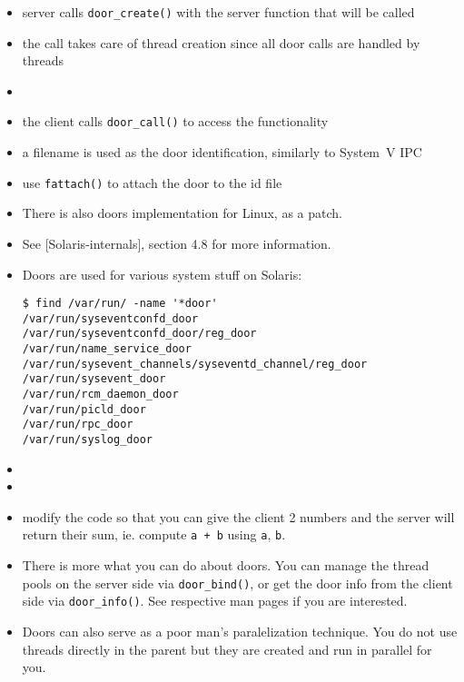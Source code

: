 \begin{itemize}
\item server calls \texttt{door\_create()} with the server function that will be
called
\item the call takes care of thread creation since all door calls are handled by
threads
\item {}
\item the client calls \texttt{door\_call()} to access the functionality
\item a filename is used as the door identification, similarly to System~V IPC
\item use \texttt{fattach()} to attach the door to the id file
\end{itemize}

\begin{itemize}
\item There is also doors implementation for Linux, as a patch.
\item See [Solaris-internals], section 4.8 for more information.
\item Doors are used for various system stuff on Solaris:

\begin{verbatim}
$ find /var/run/ -name '*door'
/var/run/syseventconfd_door
/var/run/syseventconfd_door/reg_door
/var/run/name_service_door
/var/run/sysevent_channels/syseventd_channel/reg_door
/var/run/sysevent_door
/var/run/rcm_daemon_door
/var/run/picld_door
/var/run/rpc_door
/var/run/syslog_door
\end{verbatim}
\item {}
\item {}
\item {} modify the code so that you can give the client 2
numbers and the server will return their sum, ie. compute \texttt{a + b} using
\texttt{a}, \texttt{b}.
\item There is more what you can do about doors. You can manage the thread pools
on the server side via \texttt{door\_bind()}, or get the door info from the
client side via \texttt{door\_info()}. See respective man pages if you are
interested. \item Doors can also serve as a poor man's paralelization technique.
You do not use threads directly in the parent but they are created and run in
parallel for you.
\end{itemize}

